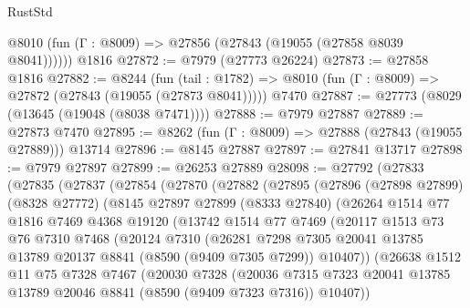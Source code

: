 \begin{lexlean}{RustStd}
\begin{coremodule}
      @8010 (fun (Γ : @8009) => @27856 (@27843 (@19055 (@27858 @8039 @8041))))))
    @1816
@27872 := @7979 (@27773 @26224)
@27873 := @27858 @1816
@27882 := @8244
    (fun (tail : @1782) => @8010 (fun (Γ : @8009) => @27872 (@27843 (@19055 (@27873 @8041)))))
    @7470
@27887 := @27773 (@8029 (@13645 (@19048 (@8038 @7471))))
@27888 := @7979 @27887
@27889 := @27873 @7470
@27895 := @8262 (fun (Γ : @8009) => @27888 (@27843 (@19055 @27889))) @13714
@27896 := @8145 @27887
@27897 := @27841 @13717
@27898 := @7979 @27897
@27899 := @26253 @27889
@28098 := @27792
    (@27833
      (@27835
        (@27837
          (@27854
            (@27870
              (@27882
                (@27895
                  (@27896
                    (@27898 @27899)
                    (@8328 @27772)
                    (@8145
                      @27897
                      @27899
                      (@8333 @27840)
                      (@26264
                        @1514
                        @77
                        @1816
                        @7469
                        @4368
                        @19120
                        (@13742
                          @1514
                          @77
                          @7469
                          (@20117
                            @1513
                            @73
                            @76
                            @7310
                            @7468
                            (@20124
                              @7310
                              (@26281
                                @7298
                                @7305
                                @20041
                                @13785
                                @13789
                                @20137
                                @8841
                                (@8590 (@9409 @7305 @7299))
                                @10407))
                            (@26638
                              @1512
                              @11
                              @75
                              @7328
                              @7467
                              (@20030
                                @7328
                                (@20036
                                  @7315
                                  @7323
                                  @20041
                                  @13785
                                  @13789
                                  @20046
                                  @8841
                                  (@8590 (@9409 @7323 @7316))
                                  @10407))

\end{coremodule}
\end{lexlean}
